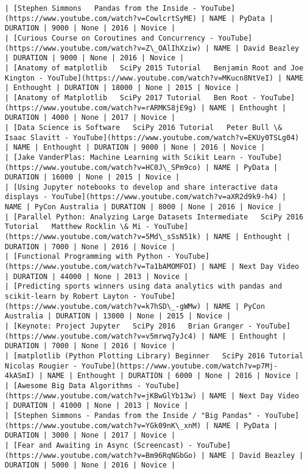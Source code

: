 \documentclass[11pt]{article}
\begin{document}
\begin{Verbatim}[commandchars=\\\{\}]
| [Stephen Simmons   Pandas from the Inside - YouTube](https://www.youtube.com/watch?v=CowlcrtSyME) | NAME | PyData | DURATION | 9000 | None | 2016 | Novice |
| [Curious Course on Coroutines and Concurrency - YouTube](https://www.youtube.com/watch?v=Z\_OAlIhXziw) | NAME | David Beazley | DURATION | 9000 | None | 2016 | Novice |
| [Anatomy of matplotlib   SciPy 2015 Tutorial   Benjamin Root and Joe Kington - YouTube](https://www.youtube.com/watch?v=MKucn8NtVeI) | NAME | Enthought | DURATION | 18000 | None | 2015 | Novice |
| [Anatomy of Matplotlib   SciPy 2017 Tutorial   Ben Root - YouTube](https://www.youtube.com/watch?v=rARMKS8jE9g) | NAME | Enthought | DURATION | 4000 | None | 2017 | Novice |
| [Data Science is Software   SciPy 2016 Tutorial   Peter Bull \& Isaac Slavitt - YouTube](https://www.youtube.com/watch?v=EKUy0TSLg04) | NAME | Enthought | DURATION | 9000 | None | 2016 | Novice |
| [Jake VanderPlas: Machine Learning with Scikit Learn - YouTube](https://www.youtube.com/watch?v=HC0J\_SPm9co) | NAME | PyData | DURATION | 16000 | None | 2015 | Novice |
| [Using Jupyter notebooks to develop and share interactive data displays - YouTube](https://www.youtube.com/watch?v=aXR2d9k9-h4) | NAME | PyCon Australia | DURATION | 8000 | None | 2016 | Novice |
| [Parallel Python: Analyzing Large Datasets Intermediate   SciPy 2016 Tutorial   Matthew Rocklin \& Mi - YouTube](https://www.youtube.com/watch?v=5Md\_sSsN51k) | NAME | Enthought | DURATION | 7000 | None | 2016 | Novice |
| [Functional Programming with Python - YouTube](https://www.youtube.com/watch?v=Ta1bAMOMFOI) | NAME | Next Day Video | DURATION | 44000 | None | 2013 | Novice |
| [Predicting sports winners using data analytics with pandas and scikit-learn by Robert Layton - YouTube](https://www.youtube.com/watch?v=k7hSD\_-gWMw) | NAME | PyCon Australia | DURATION | 13000 | None | 2015 | Novice |
| [Keynote: Project Jupyter   SciPy 2016   Brian Granger - YouTube](https://www.youtube.com/watch?v=v5mrwq7yJc4) | NAME | Enthought | DURATION | 7000 | None | 2016 | Novice |
| [matplotlib (Python Plotting Library) Beginner   SciPy 2016 Tutorial   Nicolas Rougier - YouTube](https://www.youtube.com/watch?v=p7Mj-4kASmI) | NAME | Enthought | DURATION | 6000 | None | 2016 | Novice |
| [Awesome Big Data Algorithms - YouTube](https://www.youtube.com/watch?v=jKBwGlYb13w) | NAME | Next Day Video | DURATION | 41000 | None | 2013 | Novice |
| [Stephen Simmons - Pandas from the Inside / "Big Pandas" - YouTube](https://www.youtube.com/watch?v=YGk09nK\_xnM) | NAME | PyData | DURATION | 3000 | None | 2017 | Novice |
| [Fear and Awaiting in Async (Screencast) - YouTube](https://www.youtube.com/watch?v=Bm96RqNGbGo) | NAME | David Beazley | DURATION | 5000 | None | 2016 | Novice |

\end{Verbatim}
\end{document}
